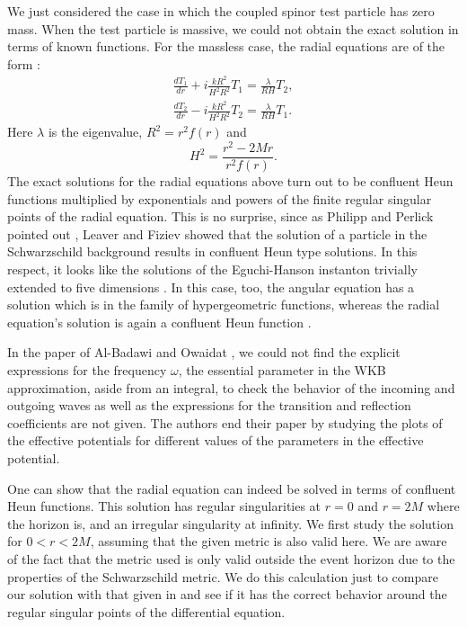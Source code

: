 \documentclass{article}
\begin{document}
We just considered the case in which the coupled spinor
test particle has zero mass. When the test particle is massive, we
could not obtain the exact solution in terms of known functions.
For the massless case, the radial equations are of the form
\cite{Badawi}:
\begin{eqnarray}
\frac{dT_{1}}{dr}+i\frac{kR^{2}}{H^{2}R^{2}}T_{1}=\frac{\lambda}{RH}T_{2}, \\
\frac{dT_{2}}{dr}-i\frac{kR^{2}}{H^{2}R^{2}}T_{2}=\frac{\lambda}{RH}T_{1}.
\end{eqnarray}
Here $\lambda$ is the eigenvalue, $R^2 = r^2 f(r)$
and
\begin{equation}
H^{2}=\frac{r^{2}-2Mr}{r^{2}f\left( r\right) }.
\end{equation}
The exact solutions for the radial equations above turn out to be
confluent Heun functions  multiplied by exponentials and powers of
the finite regular singular points of the radial equation. This is
no surprise, since as Philipp and Perlick pointed out
\cite{Philipp}, Leaver\cite{Leaver1,Leaver} and
Fiziev \cite{Fiziev,Fiziev1,Fiziev3} showed that  the solution of a
particle in the Schwarzschild background results in confluent Heun
type solutions.
In this respect, it looks like the solutions of
the Eguchi-Hanson instanton \cite{EH}  trivially extended to five
dimensions \cite{Tolga}.  In this case, too,  the angular equation
has a solution which is in the family of hypergeometric functions,
whereas the radial equation's solution is again a confluent Heun
function \cite{Heun,Ronveaux}.

In the paper of Al-Badawi and Owaidat \cite{Badawi}, we could not find the explicit
expressions for the frequency $\omega$, the essential parameter in
the WKB approximation, aside from an integral, to check the
behavior of the incoming and outgoing waves as well as the
expressions for the transition and reflection coefficients are not
given. The authors end their paper by studying the plots of the
effective potentials for different values of the parameters in the
effective potential.

One can show that the radial equation can indeed be solved in
terms of confluent Heun functions. This solution has regular
singularities at $r=0$ and $r=2M$ where the horizon is, and an
irregular singularity at infinity. We first study the solution for
$0<r<2M$, assuming that the given metric is also valid here. We
are aware of the fact that the metric used is only valid outside
the event horizon due to the properties of the Schwarzschild
metric. We do this  calculation just to compare our solution with
that given in \cite{Badawi} and see if it has the
correct behavior around the regular singular points of the
differential equation.
\end{document}
